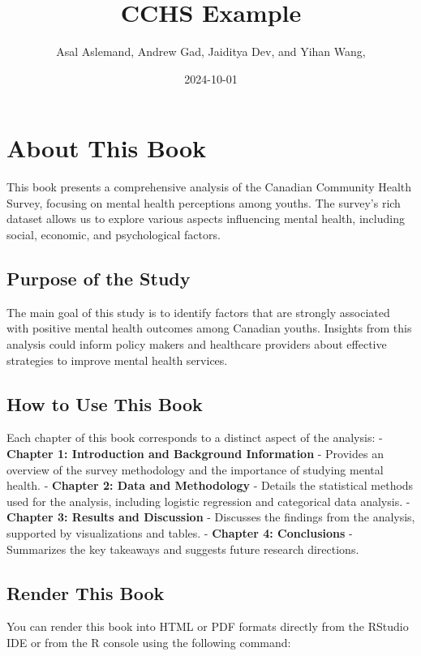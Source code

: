\documentclass[
]{book}
\title{CCHS Example}
\author{Asal Aslemand, Andrew Gad, Jaiditya Dev, and Yihan Wang,}
\date{2024-10-01}
\begin{document}
\maketitle

{
\setcounter{tocdepth}{1}
\tableofcontents
}
\chapter{About This Book}\label{about-this-book}

This book presents a comprehensive analysis of the Canadian Community Health Survey, focusing on mental health perceptions among youths. The survey's rich dataset allows us to explore various aspects influencing mental health, including social, economic, and psychological factors.

\section{Purpose of the Study}\label{purpose-of-the-study}

The main goal of this study is to identify factors that are strongly associated with positive mental health outcomes among Canadian youths. Insights from this analysis could inform policy makers and healthcare providers about effective strategies to improve mental health services.

\section{How to Use This Book}\label{how-to-use-this-book}

Each chapter of this book corresponds to a distinct aspect of the analysis:
- \textbf{Chapter 1: Introduction and Background Information} - Provides an overview of the survey methodology and the importance of studying mental health.
- \textbf{Chapter 2: Data and Methodology} - Details the statistical methods used for the analysis, including logistic regression and categorical data analysis.
- \textbf{Chapter 3: Results and Discussion} - Discusses the findings from the analysis, supported by visualizations and tables.
- \textbf{Chapter 4: Conclusions} - Summarizes the key takeaways and suggests future research directions.

\section{Render This Book}\label{render-this-book}

You can render this book into HTML or PDF formats directly from the RStudio IDE or from the R console using the following command:
\end{document}
